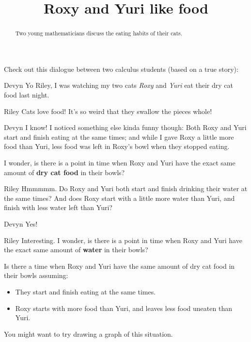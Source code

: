 \documentclass{ximera}
\title[Break-Ground:]{Roxy and Yuri like food}
\begin{document}
\begin{abstract}
Two young mathematicians discuss the eating habits of their cats.
\end{abstract}
\maketitle

Check out this dialogue between two calculus students (based on a true
story):

\begin{dialogue}
\item[Devyn] Yo Riley, I was watching my two cats
  \textit{Roxy} and \textit{Yuri} eat their dry cat food last night.
\item[Riley] Cats love food!  It's so weird that they swallow the pieces whole!
\item[Devyn] I know! I noticed something else kinda funny though:
  Both Roxy and Yuri start and finish eating at the same times; and
  while I gave Roxy a little more food than Yuri, less food was left
  in Roxy's bowl when they stopped eating.

  I wonder, is there is a point in time when Roxy and Yuri have the
  exact same amount of \textbf{dry cat food} in their bowls?
\item[Riley] Hmmmmm. Do Roxy and Yuri both start and finish
  drinking their water at the same times?  And does Roxy start with a
  little more water than Yuri, and finish with less water left than
  Yuri?
\item[Devyn] Yes!
\item[Riley] Interesting. I wonder, is there is a point in
  time when Roxy and Yuri have the exact same amount of \textbf{water}
  in their bowls?
\end{dialogue}

\begin{problem}
  Is there a time when Roxy and Yuri have the same amount of dry cat
  food in their bowls assuming:
  \begin{itemize}
  \item They start and finish eating at the same times.
  \item Roxy starts with more food than Yuri, and leaves less food uneaten than Yuri. 
  \end{itemize}
  \begin{hint}
  	You might want to try drawing a graph of this situation.
  \end{hint}
  \begin{multipleChoice}
  \end{multipleChoice}
\end{problem}
\end{document}
